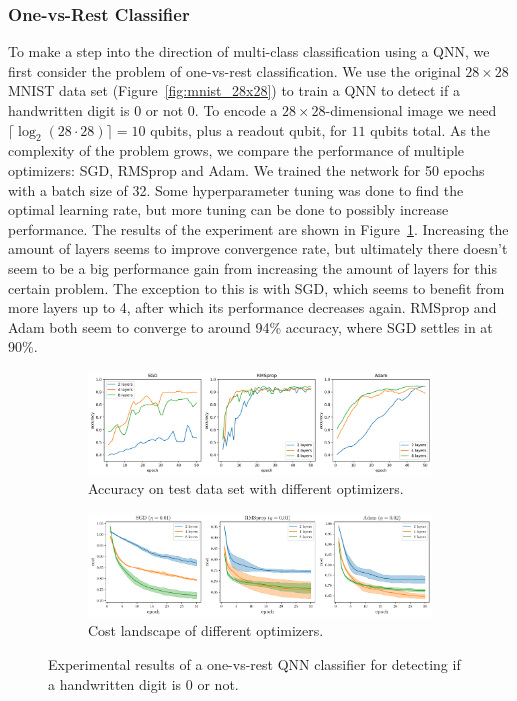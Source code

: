 \documentclass[a4paper,10pt]{article}
\begin{document}
\subsubsection{One-vs-Rest Classifier}
To make a step into the direction of multi-class classification using a QNN, we first consider the problem of one-vs-rest classification.
We use the original $28 \times 28$ MNIST data set (Figure~\ref{fig:mnist_28x28}) to train a QNN to detect if a handwritten digit is 0 or not 0.
To encode a $28 \times 28$-dimensional image we need $\lceil \log_2(28 \cdot 28) \rceil = 10$ qubits, plus a readout qubit, for $11$ qubits total.
As the complexity of the problem grows, we compare the performance of multiple optimizers: SGD, RMSprop and Adam.
We trained the network for 50 epochs with a batch size of 32.
Some hyperparameter tuning was done to find the optimal learning rate, but more tuning can be done to possibly increase performance.
The results of the experiment are shown in Figure~\ref{fig:ovr_results}.
Increasing the amount of layers seems to improve convergence rate, but ultimately there doesn't seem to be a big performance gain from increasing the amount of layers for this certain problem.
The exception to this is with SGD, which seems to benefit from more layers up to 4, after which its performance decreases again.
RMSprop and Adam both seem to converge to around 94\% accuracy, where SGD settles in at 90\%.
\begin{figure}[ht]
	\centering
	\begin{subfigure}{1\textwidth}
		\centering
		\includegraphics[width=1\linewidth]{figures/qnn_ovr_accuracy.png}
		\caption{Accuracy on test data set with different optimizers.}
		\vspace*{4mm}
	\end{subfigure}
	\begin{subfigure}{1\textwidth}
		\centering
		\includegraphics[width=1\linewidth]{figures/qnn_ovr_cost}
		\caption{Cost landscape of different optimizers.}
	\end{subfigure}
	\caption{Experimental results of a one-vs-rest QNN classifier for detecting if a handwritten digit is 0 or not.}
	\label{fig:ovr_results}
\end{figure}
\end{document}
